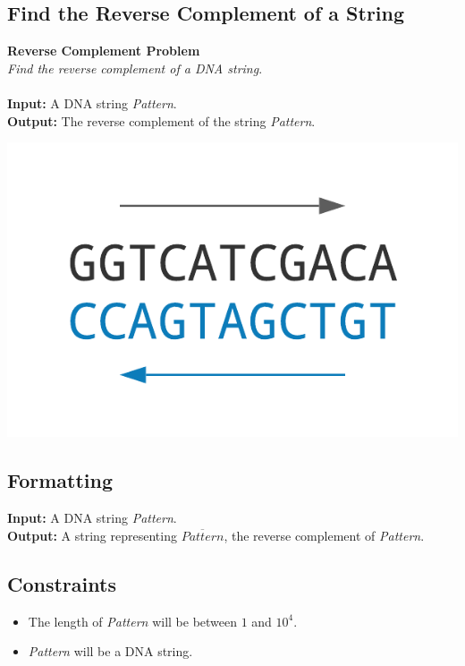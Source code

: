 \documentclass{article}
\begin{document}
\subsection{Find the Reverse Complement of a String}
\hline\vspace{5}
\noindent \textbf{Reverse Complement Problem}\\
\emph{Find the reverse complement of a DNA string}.\\ \\
\textbf{Input:} A DNA string \emph{Pattern}.\\
\textbf{Output:} The reverse complement of the string \emph{Pattern}.
\begin{center}
    \includegraphics[scale=0.28]{c1/logos/1C.png} 
\end{center}
\hline\vspace{5}

\subsection*{Formatting}
\textbf{Input:} A DNA string \emph{Pattern}.\\
\noindent \textbf{Output:} A string representing $\overline{Pattern}$, the reverse complement of \emph{Pattern}.

\subsection*{Constraints}
\begin{itemize}
    \item The length of \emph{Pattern} will be between $1$ and $10^4$.
    \item \emph{Pattern} will be a DNA string.
\end{itemize}
\pagebreak
\end{document}
